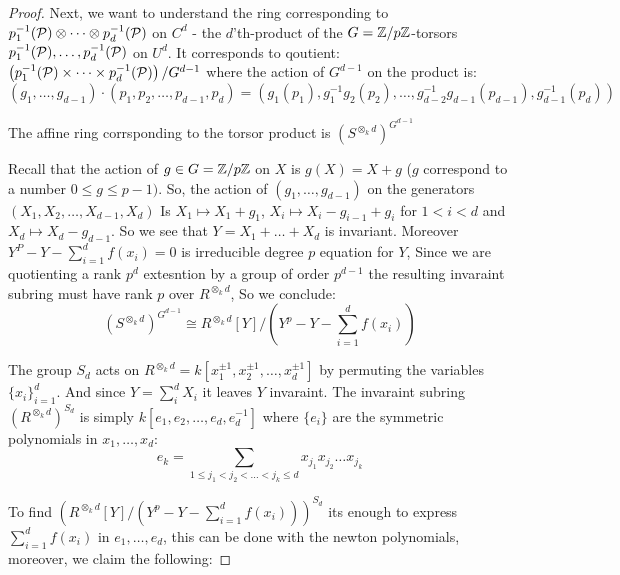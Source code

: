 \begin{proof}
     Next, we want to understand the ring corresponding to $p_1^{-1}(\mathcal{P}) \otimes \dots \otimes p_d^{-1}(\mathcal{P})$ on $C^{d}$ - 
     the $d$'th-product of the $G=\mathbb{Z}/p\mathbb{Z}$-torsors  $p_1^{-1}(\mathcal{P}), \dots, p_d^{-1}(\mathcal{P})$ on $U^{d}$. 
     It corresponds to qoutient:
     $\left(p_1^{-1}(\mathcal{P}) \times \dots \times p_d^{-1}(\mathcal{P})\right) / G^{d-1}$ where the action of $G^{d-1}$ on the product is:
     $$(g_1, \dots, g_{d-1}) \cdot (p_1, p_2, \dots, p_{d-1}, p_{d}) = (g_1(p_1), g_1^{-1}g_2(p_2), \dots, 
     g_{d-2}^{-1}g_{d-1}(p_{d-1}), g_{d-1}^{-1}(p_d))$$
     
     The affine ring corrsponding to the torsor product is $\left(S^{\otimes_k d}\right)^{G^{d-1}}$
    
     Recall that the action of $g \in G=\mathbb{Z}/p\mathbb{Z}$ on $X$ is $g(X) = X + g$ ($g$ correspond to a number $0 \leq g \leq p-1)$.
     So, the action of $(g_1, \dots, g_{d-1})$ on the generators $(X_1, X_2, \dots, X_{d-1}, X_{d})$
     Is $X_1 \mapsto X_1 + g_1$, $X_i \mapsto X_i - g_{i-1} + g_i$ for $1<i<d$ and $X_d \mapsto X_d - g_{d-1}$.
     So we see that $Y=X_1 + \dots + X_d$ is invariant.
     Moreover $Y^P - Y - \sum_{i=1}^d f(x_i)=0$ is irreducible degree $p$ equation for $Y$,
     Since we are quotienting a rank $p^{d}$ extesntion by a group of order $p^{d-1}$ the resulting invaraint subring must
     have rank $p$ over $R^{\otimes_k d}$, So we conclude:
     \[
          \left(S^{\otimes_k d}\right)^{G^{d-1}} \cong R^{\otimes_k d}[Y] / (Y^p - Y - \sum_{i=1}^d f(x_i))
     \]  
     
     The group $S_d$ acts on 
     $ R^{\otimes_k d} = k[x_1^{\pm 1}, x_2^{\pm 1}, \dots, x_d^{\pm 1}]$
      by permuting the variables $\{x_i\}_{i=1}^d$.
     And since $Y=\sum_i^d X_i$ it leaves $Y$ invaraint. 
     The invaraint subring $(R^{\otimes_k d})^{S_d}$ is simply $k[e_1, e_2, \dots, e_d, e_d^{-1}]$
     where $\{ e_i \}$  are the symmetric polynomials in $x_1, \dots, x_d$:
     $$e_k = \sum_{1 \le j_1 < j_2 < \dots < j_k \le d} x_{j_1} x_{j_2} \dots x_{j_k}$$
     
     To find $\left(R^{\otimes_k d}[Y] / (Y^p - Y - \sum_{i=1}^d f(x_i))\right)^{S_d}$ its enough to express
     $\sum_{i=1}^d f(x_i)$ in $e_1, \dots, e_d$, this can be done with the newton polynomials, moreover, we claim the following:


\end{proof}
